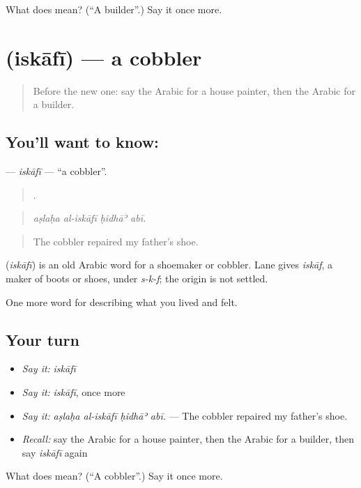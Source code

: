 \begin{tcolorbox}[breakable,colback=teal!4,colframe=teal!35!black,title={Before you move on}]
What does  mean? (\textquotedblleft{}A builder\textquotedblright{}.) Say it once more.
\end{tcolorbox}
\section[\texorpdfstring{\ar{إسكافي} (iskāfī)}{إسكافي (iskāfī)}]{ (iskāfī) — a cobbler}

\label{lesson:AR-C526-iskafi}



\begin{quote}
Before the new one: say the Arabic for a house painter, then the Arabic for a builder.
\end{quote}

\subsection*{You'll want to know: }
\textbf{} — \emph{iskāfī} — \textquotedblleft{}a cobbler\textquotedblright{}.

\begin{quote}
   .
\end{quote}

\begin{quote}
\emph{aṣlaḥa al-iskāfī ḥidhāʾ abī.}
\end{quote}

\begin{quote}
The cobbler repaired my father's shoe.
\end{quote}

\begin{cousinweb}
\textbf{} (\emph{iskāfī}) is an old Arabic word for a shoemaker or cobbler. Lane gives \emph{iskāf}, a maker of boots or shoes, under \emph{s-k-f}; the origin is not settled.
\end{cousinweb}

\begin{grammarlens}[title={What you've built}]
One more word for describing what you lived and felt.
\end{grammarlens}

\subsection*{Your turn}
\begin{itemize}
\raggedright
  \item \emph{Say it:} \emph{iskāfī}
  \item \emph{Say it:} \emph{iskāfī}, once more
  \item \emph{Say it:} \emph{aṣlaḥa al-iskāfī ḥidhāʾ abī.} — The cobbler repaired my father's shoe.
  \item \emph{Recall:} say the Arabic for a house painter, then the Arabic for a builder, then say \emph{iskāfī} again
\end{itemize}

\begin{tcolorbox}[breakable,colback=teal!4,colframe=teal!35!black,title={Before you move on}]
What does  mean? (\textquotedblleft{}A cobbler\textquotedblright{}.) Say it once more.
\end{tcolorbox}
